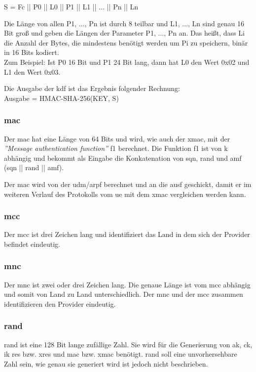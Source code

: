 S = Fc || P0 || L0 || P1 || L1 || $ \dots $ || Pn || Ln 

Die L\"ange von allen P1, $ \dots $, Pn ist durch 8 teilbar und L1, $ \dots $, Ln sind genau 16 Bit gro{\ss} und geben die L\"angen der Parameter P1, $ \dots $, Pn an. 
Das hei{\ss}t, dass Li die Anzahl der Bytes, die mindestens ben\"otigt werden um Pi zu speichern, bin\"ar in 16 Bits kodiert. \\
Zum Beispiel: Ist P0 16 Bit und P1 24 Bit lang, dann hat L0 den Wert 0x02 und L1 den Wert 0x03.

Die Ausgabe der \gls{kdf} ist das Ergebnis folgender Rechnung: \\
Ausgabe = HMAC-SHA-256(KEY, S) \\

\subsubsection{\gls{mac}}
Der \gls{mac} hat eine L\"ange von 64 Bits und wird, wie auch der \gls{xmac}, mit der \textit{''Message authentication function''} f1 berechnet. %
Die Funktion f1 ist von \gls{k} abh\"angig und bekommt als Eingabe die Konkatenation von \gls{sqn}, \gls{rand} und \gls{amf} (\gls{sqn} || \gls{rand} || \gls{amf}). %

Der \gls{mac} wird von der \gls{udm}/\gls{arpf} berechnet und an die \gls{ausf} geschickt, damit er im weiteren Verlauf des Protokolls vom \gls{ue} mit dem \gls{xmac} vergleichen werden kann.

\subsubsection{\gls{mcc}}
Der \gls{mcc} ist drei Zeichen lang und identifiziert das Land in dem sich der Provider befindet eindeutig. %

\subsubsection{\gls{mnc}}
Der \gls{mnc} ist zwei oder drei Zeichen lang. %
Die genaue L\"ange ist vom \gls{mcc} abh\"angig und somit von Land zu Land unterschiedlich.
Der \gls{mnc} und der \gls{mcc} zusammen identifizieren den Provider eindeutig.


\subsubsection{\gls{rand}}
\gls{rand} ist eine 128 Bit lange zuf\"allige Zahl. %
Sie wird f\"ur die Generierung von \gls{ak}, \gls{ck}, \gls{ik} \gls{res} bzw. \gls{xres} und \gls{mac} bzw. \gls{xmac} ben\"otigt. 
\gls{rand} soll eine unvorhersehbare Zahl sein, wie genau sie generiert wird ist jedoch nicht beschrieben. %

